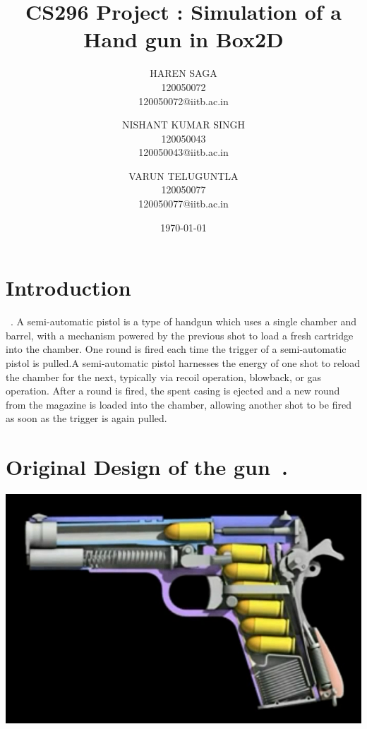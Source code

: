 \documentclass [11pt]{report}
\begin{document}
\title{CS296 Project : Simulation of a Hand gun in Box2D}
\author{
    HAREN SAGA\\
    120050072\\
    120050072@iitb.ac.in
      \and
    NISHANT KUMAR SINGH\\  
    120050043\\
    120050043@iitb.ac.in
    \and
    VARUN TELUGUNTLA\\
    120050077\\
   120050077@iitb.ac.in
}

\date{\today}

\maketitle

\section{Introduction}
~\cite{sahg}.
A semi-automatic pistol is a type of handgun which uses a single chamber and barrel, with a mechanism powered by the previous shot to load a fresh cartridge into the chamber. One round is fired each time the trigger of a semi-automatic pistol is pulled.A semi-automatic pistol harnesses the energy of one shot to reload the chamber for the next, typically via recoil operation, blowback, or gas operation. After a round is fired, the spent casing is ejected and a new round from the magazine is loaded into the chamber, allowing another shot to be fired as soon as the trigger is again pulled. 


\section{Original Design of the gun~\cite{utubesource}.}
\begin{center}
\includegraphics[scale=0.5]{./images/actgun.png}
\end{center}
\end{document}
